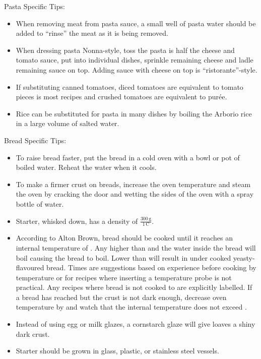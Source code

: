 \documentclass{book}
\begin{document}
\noindent Pasta Specific Tips:
\begin{itemize}
\item When removing meat from pasta sauce, a small well of pasta water should be added to ``rinse'' the meat as it is being removed.
\item When dressing pasta Nonna-style, toss the pasta is half the cheese and tomato sauce, put into individual dishes, sprinkle remaining cheese and ladle remaining sauce on top. Adding sauce with cheese on top is ``ristorante''-style.
\item If substituting canned tomatoes, diced tomatoes are equivalent to tomato pieces is most recipes and crushed tomatoes are equivalent to pur\'ee.
\item Rice can be substituted for pasta in many dishes by boiling the Arborio rice in a large volume of salted water.
\end{itemize}

\noindent Bread Specific Tips:
\begin{itemize}
\item To raise bread faster, put the bread in a cold oven with a bowl or pot of boiled water. Reheat the water when it cools.
\item To make a firmer crust on breads, increase the oven temperature and steam the oven by cracking the door and wetting the sides of the oven with a spray bottle of water.
\item Starter, whisked down, has a density of $\frac{300\,\mathrm{g}}{1\,\mathrm{C}}$.
\item According to Alton Brown, bread should be cooked until it reaches an internal temperature of . Any higher than  and the water inside the bread will boil causing the bread to boil. Lower than  will result in under cooked yeasty-flavoured bread. Times are suggestions based on experience before cooking by temperature or for recipes where inserting a temperature probe is not practical. Any recipes where bread is not cooked to  are explicitly labelled. If a bread has reached  but the crust is not dark enough, decrease oven temperature by  and watch that the internal temperature does not exceed .
\item Instead of using egg or milk glazes, a cornstarch glaze will give loaves a shiny dark crust.
\item Starter should be grown in glass, plastic, or stainless steel vessels.
\end{itemize}
\end{document}
